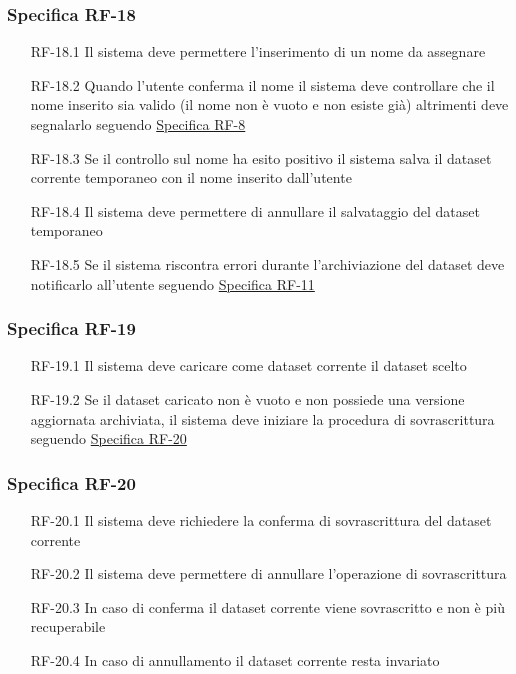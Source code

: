 \subsubsection{Specifica RF-18}
\label{subsubsec:RF-18}
\begin{enumerate}
    \item[RF-18.1] Il sistema deve permettere l'inserimento di un nome da assegnare
    \item[RF-18.2] Quando l'utente conferma il nome il sistema deve controllare che il nome inserito sia valido (il nome non è vuoto e non esiste già) altrimenti deve segnalarlo seguendo \hyperref[subsubsec:RF-8]{Specifica RF-8}
    \item[RF-18.3] Se il controllo sul nome ha esito positivo il sistema salva il dataset corrente temporaneo con il nome inserito dall'utente
    \item[RF-18.4] Il sistema deve permettere di annullare il salvataggio del dataset temporaneo
    \item[RF-18.5] Se il sistema riscontra errori durante l'archiviazione del dataset deve notificarlo all'utente seguendo \hyperref[subsubsec:RF-11]{Specifica RF-11}
\end{enumerate}

\subsubsection{Specifica RF-19}
\label{subsubsec:RF-19}
\begin{enumerate}
    \item[RF-19.1] Il sistema deve caricare come dataset corrente il dataset scelto
    \item[RF-19.2] Se il dataset caricato non è vuoto e non possiede una versione aggiornata archiviata, il sistema deve iniziare la procedura di sovrascrittura seguendo \hyperref[subsubsec:RF-20]{Specifica RF-20}
\end{enumerate}

\subsubsection{Specifica RF-20}
\label{subsubsec:RF-20}
\begin{enumerate}
    \item[RF-20.1] Il sistema deve richiedere la conferma di sovrascrittura del dataset corrente
    \item[RF-20.2] Il sistema deve permettere di annullare l'operazione di sovrascrittura
    \item[RF-20.3] In caso di conferma il dataset corrente viene sovrascritto e non è più recuperabile
    \item[RF-20.4] In caso di annullamento il dataset corrente resta invariato 
\end{enumerate}

